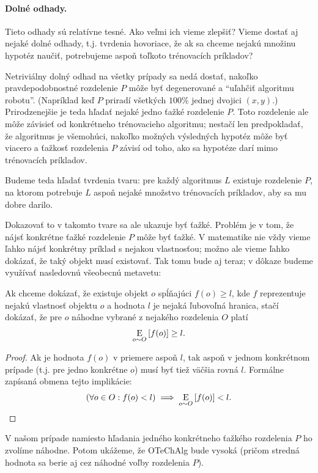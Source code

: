 \paragraph{Dolné odhady.} Tieto odhady sú relatívne tesné. Ako veľmi ich
vieme zlepšiť? Vieme dostať aj nejaké dolné odhady, t.j. tvrdenia hovoriace,
že ak sa chceme nejakú množinu hypotéz naučiť, potrebujeme aspoň toľkoto
trénovacích príkladov?

Netriviálny dolný odhad na všetky prípady sa nedá dostať, nakoľko
pravdepodobnostné rozdelenie $P$ môže byť degenerované a ``uľahčiť
algoritmu robotu''. (Napríklad keď $P$ priradí všetkých $100\%$
jednej dvojici $(x, y)$.) Prirodzenejšie je teda hľadať nejaké
jedno ťažké rozdelenie $P$. Toto rozdelenie ale môže závisieť od
konkrétneho trénovacieho algoritmu; nestačí len predpokladať, že
algoritmus je všemohúci, nakoľko možných výsledných hypotéz môže
byť viacero a ťažkosť rozdelenia $P$ závisí od toho, ako sa hypotéze
darí mimo trénovacích príkladov.

Budeme teda hľadať tvrdenia tvaru: pre každý algoritmus $L$ existuje
rozdelenie $P$, na ktorom potrebuje $L$ aspoň nejaké množstvo trénovacích
príkladov, aby sa mu dobre darilo.

Dokazovať to v takomto tvare sa ale ukazuje byť ťažké. Problém je v tom,
že nájsť konkrétne ťažké rozdelenie $P$ môže byť ťažké. V matematike nie vždy
vieme ľahko nájsť konkrétny príklad s nejakou vlastnosťou; možno ale
vieme ľahko dokázať, že taký objekt musí existovať. Tak tomu bude aj teraz;
v dôkaze budeme využívať nasledovnú všeobecnú metavetu:

\begin{theorem}
  Ak chceme dokázať, že existuje objekt $o$ spĺňajúci $f(o) \geq l$,
  kde $f$ reprezentuje nejakú vlastnosť objektu $o$ a hodnota $l$
  je nejaká ľubovoľná hranica, stačí dokázať, že pre $o$ náhodne
  vybrané z nejakého rozdelenia $O$ platí
  $$ \operatorname*{\mathrm{E}}_{o \sim O} \left[ f(o) \right] \geq l. $$
\end{theorem}
\begin{proof}
  Ak je hodnota $f(o)$ v priemere aspoň $l$, tak aspoň v jednom konkrétnom
  prípade (t.j. pre jedno konkrétne $o$) musí byť tiež väčšia rovná $l$.
  Formálne zapísaná obmena tejto implikácie:
  $$ (\forall o \in O: f(o) < l) \implies \operatorname*{\mathrm{E}}_{o \sim O} \left[ f(o) \right] < l. $$
\end{proof}

V našom prípade namiesto hľadania jedného konkrétneho ťažkého
rozdelenia $P$ ho zvolíme náhodne. Potom ukážeme, že OTeChAlg
bude vysoká (pričom stredná hodnota sa berie aj cez náhodné voľby
rozdelenia $P$).

